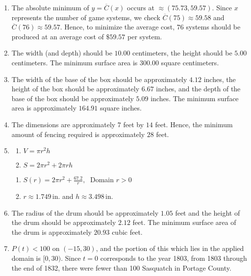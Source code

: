 \documentclass{ximera}
\begin{document}
\begin{enumerate}
\setcounter{enumi}{\value{HW}}

\item  The absolute minimum of $y=\overline{C}(x)$ occurs at $\approx (75.73, 59.57)$.  Since $x$ represents the number of game systems, we check $\overline{C}(75) \approx 59.58$ and $\overline{C}(76) \approx 59.57$.  Hence, to minimize the average cost, $76$ systems should be produced at an average cost of $\$59.57$ per system.

\item The width (and depth) should be $10.00$ centimeters, the height should be $5.00$ centimeters.  The minimum surface area is $300.00$ square centimeters.

\item The width of the base of the box should be approximately $4.12$ inches, the height of the box should be approximately $ 6.67$ inches, and the depth of the base of the box should be approximately $5.09$ inches. The minimum surface area is approximately $164.91$ square inches.

\newpage

\item The dimensions are  approximately  $7$ feet by $14$ feet.  Hence, the minimum amount of fencing required is approximately  $28$ feet.

\item 

\begin{multicols}{2}
\begin{enumerate}

\item $V = \pi r^{2}h$
\item $S = 2 \pi r^{2} + 2\pi r h$

\setcounter{HWindent}{\value{enumii}}
\end{enumerate}
\end{multicols}



\begin{multicols}{2}
\begin{enumerate}
\setcounter{enumii}{\value{HWindent}}

\item $S(r) = 2\pi r^{2} + \frac{67.2}{r}, \;$  Domain $r > 0$
\item $r \approx 1.749\,$in. and $h \approx 3.498\,$in. 

\end{enumerate}
\end{multicols}

\item  The radius of the drum should be approximately $1.05$ feet and the height of the drum should be approximately  $2.12$ feet.  The minimum surface area of the drum is approximately $20.93$ cubic feet.

\item $P(t) < 100$ on $(-15, 30)$, and the portion of this which lies in the applied domain is $[0,30)$.  Since $t=0$ corresponds to the year 1803, from 1803 through the end of 1832, there were fewer than 100 Sasquatch in Portage County.

\setcounter{HW}{\value{enumi}}
\end{enumerate}
\end{document}
